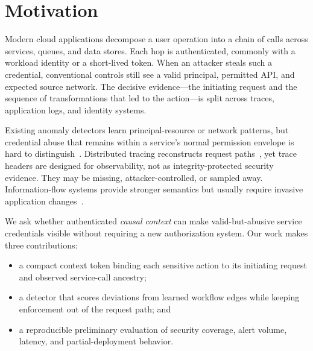 \section{Motivation}
\label{sec:motivation}

Modern cloud applications decompose a user operation into a chain of calls
across services, queues, and data stores. Each hop is authenticated, commonly
with a workload identity or a short-lived token. When an attacker steals such a
credential, conventional controls still see a valid principal, permitted API,
and expected source network. The decisive evidence---the initiating request and
the sequence of transformations that led to the action---is split across
traces, application logs, and identity systems.

Existing anomaly detectors learn principal-resource or network patterns, but
credential abuse that remains within a service's normal permission envelope is
hard to distinguish~\citep{bilge2017risk,siadati2017detecting}. Distributed
tracing reconstructs request paths~\citep{sigelman2010dapper}, yet trace headers
are designed for observability, not as integrity-protected security evidence.
They may be missing, attacker-controlled, or sampled away. Information-flow
systems provide stronger semantics but usually require invasive application
changes~\citep{pasquier2017practical}.

We ask whether authenticated \emph{causal context} can make valid-but-abusive
service credentials visible without requiring a new authorization system. Our
work makes three contributions:

\begin{itemize}
  \item a compact context token binding each sensitive action to its initiating
        request and observed service-call ancestry;
  \item a detector that scores deviations from learned workflow edges while
        keeping enforcement out of the request path; and
  \item a reproducible preliminary evaluation of security coverage, alert
        volume, latency, and partial-deployment behavior.
\end{itemize}

